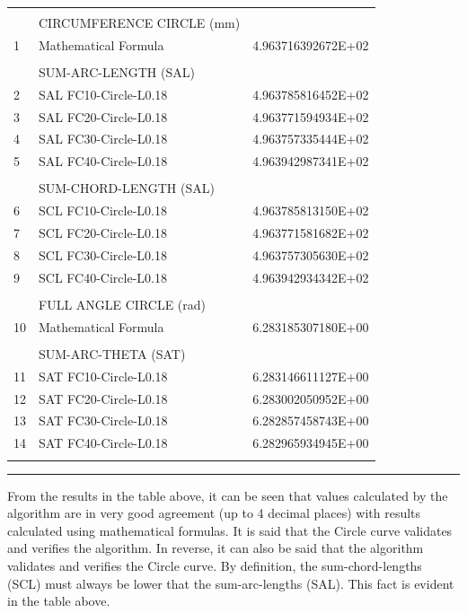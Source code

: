 \begin{table}[ht]
{\begin{tabular}{ p{0.2cm} p{8.80cm} p{4.00cm} }
\hline
  &                              & \\
  & CIRCUMFERENCE CIRCLE (mm)    & \\
1 & Mathematical Formula         & 4.963716392672E+02 \\
&                          & \\
& SUM-ARC-LENGTH (SAL)     & \\
2 & SAL FC10-Circle-L0.18    & 4.963785816452E+02  \\
3 & SAL FC20-Circle-L0.18    & 4.963771594934E+02  \\
4 & SAL FC30-Circle-L0.18    & 4.963757335444E+02  \\
5 & SAL FC40-Circle-L0.18    & 4.963942987341E+02  \\
&                            & \\
& SUM-CHORD-LENGTH (SAL)     & \\                         
6 & SCL FC10-Circle-L0.18    & 4.963785813150E+02  \\
7 & SCL FC20-Circle-L0.18    & 4.963771581682E+02  \\
8 & SCL FC30-Circle-L0.18    & 4.963757305630E+02  \\
9 & SCL FC40-Circle-L0.18    & 4.963942934342E+02  \\                         
&                             & \\
& FULL ANGLE CIRCLE  (rad)    & \\
10 & Mathematical Formula     & 6.283185307180E+00 \\
&                             & \\
& SUM-ARC-THETA (SAT)         & \\
11 & SAT FC10-Circle-L0.18    & 6.283146611127E+00  \\
12 & SAT FC20-Circle-L0.18    & 6.283002050952E+00  \\
13 & SAT FC30-Circle-L0.18    & 6.282857458743E+00  \\
14 & SAT FC40-Circle-L0.18    & 6.282965934945E+00  \\    			
   &                          & 
\end{tabular}
		
}   %
\hrule
\end{table}

From the results in the table above, it can be seen that values calculated by the algorithm are in very good agreement (up to 4 decimal places) with results calculated using mathematical formulas. It is said that the Circle curve validates and verifies the algorithm. In reverse, it can also be said that the algorithm validates and verifies the Circle curve. By definition, the sum-chord-lengths (SCL) must always be lower that the sum-arc-lengths (SAL). This fact is evident in the table above.


